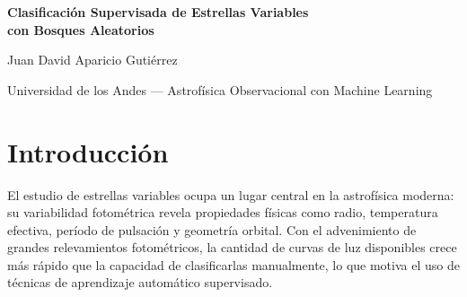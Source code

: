 \documentclass[letterpaper,12pt]{extarticle}
\begin{document}
\begin{center}
    \Large \textbf{Clasificación Supervisada de Estrellas Variables\\
    con Bosques Aleatorios}

    \vspace{4mm}
    \large Juan David Aparicio Gutiérrez

    \vspace{2mm}
    \normalsize Universidad de los Andes --- Astrofísica Observacional con Machine Learning
\end{center}

\vspace{2mm}

\begin{abstract}
Se presenta la clasificación supervisada de 6\,366 estrellas variables del
relevamiento OGLE-IV en cuatro categorías: binarias, variables de período largo
(LPV), pulsantes y otras. Partiendo únicamente de series de tiempo fotométricas
en las bandas $I$ y $V$, se construyeron y evaluaron nueve features estadísticos
mediante histogramas por clase. Tras la exploración se retuvieron cuatro: el
color calculado con el estimador de biweight location $(V-I)_{BW}$, el
logaritmo del período obtenido con Lomb-Scargle a partir de la curva de luz en
banda $I$, la asimetría y la amplitud fotométrica. Un clasificador de bosque
aleatorio con estos cuatro features alcanzó una exactitud global del 91.2\%, con
el mejor desempeño para las LPV (F1\,=\,0.962).
\end{abstract}

\section{Introducción}

El estudio de estrellas variables ocupa un lugar central en la astrofísica
moderna: su variabilidad fotométrica revela propiedades físicas como radio,
temperatura efectiva, período de pulsación y geometría orbital. Con el advenimiento
de grandes relevamientos fotométricos, la cantidad de curvas de luz disponibles
crece más rápido que la capacidad de clasificarlas manualmente, lo que motiva el
uso de técnicas de aprendizaje automático supervisado.
\end{document}
